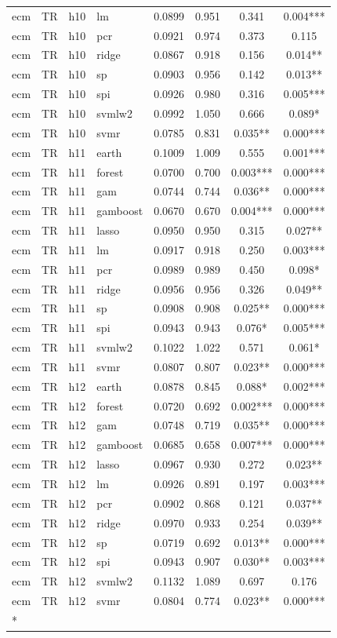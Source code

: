 \begin{ThreePartTable}
\begin{longtable}[t]{llclcccc}
ecm & TR & h10 & lm & 0.0899 & 0.951 & 0.341 & 0.004***\\
ecm & TR & h10 & pcr & 0.0921 & 0.974 & 0.373 & 0.115\\
ecm & TR & h10 & ridge & 0.0867 & 0.918 & 0.156 & 0.014**\\
ecm & TR & h10 & sp & 0.0903 & 0.956 & 0.142 & 0.013**\\
ecm & TR & h10 & spi & 0.0926 & 0.980 & 0.316 & 0.005***\\
ecm & TR & h10 & svmlw2 & 0.0992 & 1.050 & 0.666 & 0.089*\\
ecm & TR & h10 & svmr & 0.0785 & 0.831 & 0.035** & 0.000***\\
\addlinespace
ecm & TR & h11 & earth & 0.1009 & 1.009 & 0.555 & 0.001***\\
ecm & TR & h11 & forest & 0.0700 & 0.700 & 0.003*** & 0.000***\\
ecm & TR & h11 & gam & 0.0744 & 0.744 & 0.036** & 0.000***\\
ecm & TR & h11 & gamboost & 0.0670 & 0.670 & 0.004*** & 0.000***\\
ecm & TR & h11 & lasso & 0.0950 & 0.950 & 0.315 & 0.027**\\
ecm & TR & h11 & lm & 0.0917 & 0.918 & 0.250 & 0.003***\\
ecm & TR & h11 & pcr & 0.0989 & 0.989 & 0.450 & 0.098*\\
ecm & TR & h11 & ridge & 0.0956 & 0.956 & 0.326 & 0.049**\\
ecm & TR & h11 & sp & 0.0908 & 0.908 & 0.025** & 0.000***\\
ecm & TR & h11 & spi & 0.0943 & 0.943 & 0.076* & 0.005***\\
ecm & TR & h11 & svmlw2 & 0.1022 & 1.022 & 0.571 & 0.061*\\
ecm & TR & h11 & svmr & 0.0807 & 0.807 & 0.023** & 0.000***\\
\addlinespace
ecm & TR & h12 & earth & 0.0878 & 0.845 & 0.088* & 0.002***\\
ecm & TR & h12 & forest & 0.0720 & 0.692 & 0.002*** & 0.000***\\
ecm & TR & h12 & gam & 0.0748 & 0.719 & 0.035** & 0.000***\\
ecm & TR & h12 & gamboost & 0.0685 & 0.658 & 0.007*** & 0.000***\\
ecm & TR & h12 & lasso & 0.0967 & 0.930 & 0.272 & 0.023**\\
ecm & TR & h12 & lm & 0.0926 & 0.891 & 0.197 & 0.003***\\
ecm & TR & h12 & pcr & 0.0902 & 0.868 & 0.121 & 0.037**\\
ecm & TR & h12 & ridge & 0.0970 & 0.933 & 0.254 & 0.039**\\
ecm & TR & h12 & sp & 0.0719 & 0.692 & 0.013** & 0.000***\\
ecm & TR & h12 & spi & 0.0943 & 0.907 & 0.030** & 0.003***\\
ecm & TR & h12 & svmlw2 & 0.1132 & 1.089 & 0.697 & 0.176\\
ecm & TR & h12 & svmr & 0.0804 & 0.774 & 0.023** & 0.000***\\*
\end{longtable}
\end{ThreePartTable}
\endgroup{}
